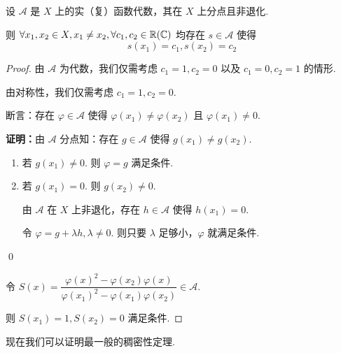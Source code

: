 \begin{lemma}
    设 $\mathscr{A}$ 是 $X$ 上的实（复）函数代数，其在 $X$ 上分点且非退化.

    则 $\forall x_1,x_2\in X,x_1\ne x_2,\forall c_1,c_2\in\mathbb{R}(\mathbb{C})$ 均存在 $s\in\mathscr{A}$ 使得
$$
s(x_1)=c_1,s(x_2)=c_2
$$
\end{lemma}
\begin{proof}
    由 $\mathscr{A}$ 为代数，我们仅需考虑 $c_1=1,c_2=0$ 以及 $c_1=0,c_2=1$ 的情形.

    由对称性，我们仅需考虑 $c_1=1,c_2=0$.

    断言：存在 $\varphi\in\mathscr{A}$ 使得 $\varphi(x_1)\ne\varphi(x_2)$ 且 $\varphi(x_1)\ne 0$.

    \textbf{证明：}由 $\mathscr{A}$ 分点知：存在 $g\in\mathscr{A}$ 使得 $g(x_1)\ne g(x_2)$.

    \begin{enumerate}
        \item 若 $g(x_1)\ne 0$. 则 $\varphi=g$ 满足条件.
        
        \item 若 $g(x_1)=0$. 则 $g(x_2)\ne 0$.
        
        由 $\mathscr{A}$ 在 $X$ 上非退化，存在 $h\in\mathscr{A}$ 使得 $h(x_1)=0$.

        令 $\varphi=g+\lambda h,\lambda\ne 0$. 则只要 $\lambda$ 足够小，$\varphi$ 就满足条件.
    \end{enumerate}

    \qed

    令 $S(x)=\dfrac{\varphi(x)^2-\varphi(x_2)\varphi(x)}{\varphi(x_1)^2-\varphi(x_1)\varphi(x_2)}\in\mathscr{A}$.

    则 $S(x_1)=1,S(x_2)=0$ 满足条件.
\end{proof}

现在我们可以证明最一般的稠密性定理.

